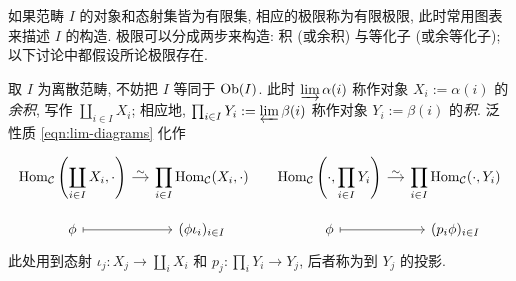 如果范畴 $I$ 的对象和态射集皆为有限集, 相应的极限称为有限极限, 此时常用图表来描述 $I$ 的构造. 极限可以分成两步来构造: 积 (或余积) 与等化子 (或余等化子); 以下讨论中都假设所论极限存在.
\begin{asparaenum}
	\item 取 $I$ 为离散范畴, 不妨把 $I$ 等同于 $\operatorname{Ob}(I)$. 此时 $\varinjlim \alpha(i)$ 称作对象 $X_i := \alpha(i)$ 的\emph{余积}, 写作 $\coprod_{i \in I} X_i$; 相应地, $\prod_{i \in I} Y_i := \varprojlim \beta(i)$ 称作对象 $Y_i := \beta(i)$ 的\emph{积}. 泛性质 \eqref{eqn:lim-diagrams} 化作
		\[\begin{tikzcd}[row sep=small, column sep=small]
			\Hom_{\mathcal{C}} \left( \displaystyle\coprod_{i \in I} X_i, \cdot \right) \arrow[r, "\sim"] & \displaystyle\prod_{i \in I} \Hom_{\mathcal{C}}(X_i, \cdot) & \Hom_{\mathcal{C}} \left( \cdot, \displaystyle\prod_{i \in I} Y_i \right)  \arrow[r, "\sim"] & \displaystyle\prod_{i \in I} \Hom_{\mathcal{C}}(\cdot, Y_i) \\
			\phi \arrow[mapsto, r] & (\phi \iota_i)_{i \in I} & \phi \arrow[mapsto, r] & (p_i \phi)_{i \in I}
		\end{tikzcd}\]
		此处用到态射 $\iota_j: X_j \to \coprod_i X_i$ 和 $p_j: \prod_i Y_i \to Y_j$, 后者称为到 $Y_j$ 的投影.


\end{asparaenum}
